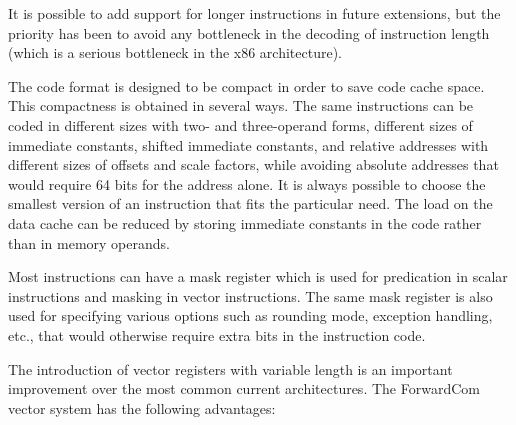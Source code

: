 \documentclass[forwardcom.tex]{subfiles}
\begin{document}
It is possible to add support for longer instructions in future extensions, but the priority has been to avoid any bottleneck in the decoding of instruction length (which is a serious bottleneck in the x86 architecture). 
\vspace{2mm}

The code format is designed to be compact in order to save code cache space. This compactness is obtained in several ways. The same instructions can be coded in different sizes with two- and three-operand forms, different sizes of immediate constants, shifted immediate constants, and relative addresses with different sizes of offsets and scale factors, while avoiding absolute addresses that would require 64 bits for the address alone. It is always possible to choose the smallest version of an instruction that fits the particular need. The load on the data cache can be reduced by storing immediate constants in the code rather than in memory operands.
\vspace{2mm}

Most instructions can have a mask register which is used for predication in scalar instructions and masking in vector instructions. The same mask register is also used for specifying various options such as rounding mode, exception handling, etc., that would otherwise require extra bits in the instruction code. 
\vspace{2mm}

The introduction of vector registers with variable length is an important improvement over the most common current architectures. The ForwardCom vector system has the following advantages: 
\end{document}

